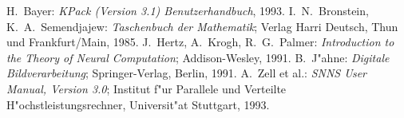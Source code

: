 \newpage
\begin{thebibliography}{Bronstein 85}
 H.~Bayer: {\it KPack (Version 3.1)
Benutzerhandbuch}, 1993.
I.~N.~Bronstein, K.~A.~Semendjajew: {\it Taschenbuch der Mathematik};
Verlag Harri Deutsch, Thun und Frankfurt/Main, 1985.
J.~Hertz, A.~Krogh, R.~G.~Palmer: {\it Introduction to the Theory
of Neural Computation}; Addison-Wesley, 1991.
B.~J"ahne: {\it Digitale Bildverarbeitung}; Springer-Verlag, Berlin, 1991.
A.~Zell et al.: {\it SNNS User Manual, Version 3.0}; 
Institut f"ur Parallele und Verteilte H"ochstleistungsrechner, 
Universit"at Stuttgart, 1993.
\end{thebibliography}

